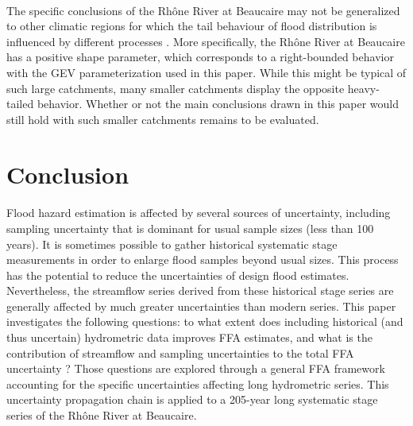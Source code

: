     \paragraph{}
    The specific conclusions of the Rhône River at Beaucaire may not be generalized to other climatic regions for which the tail behaviour of flood distribution is influenced by different processes \citep{merz_understanding_2022}. More specifically, the Rhône River at Beaucaire has a positive shape parameter, which corresponds to a right-bounded behavior with the GEV parameterization used in this paper. While this might be typical of such large catchments, many smaller catchments display the opposite heavy-tailed behavior. Whether or not the main conclusions drawn in this paper would still hold with such smaller catchments remains to be evaluated.

    
\section{Conclusion}
\label{sec:Conclusion}

    \paragraph{} Flood hazard estimation is affected by several sources of uncertainty, including sampling uncertainty that is dominant for usual sample sizes (less than 100 years). It is sometimes possible to gather historical systematic stage measurements in order to enlarge flood samples beyond usual sizes. This process has the potential to reduce the uncertainties of design flood estimates. Nevertheless, the streamflow series derived from these historical stage series are generally affected by much greater uncertainties than modern series. This paper investigates the following questions: to what extent does including historical (and thus uncertain) hydrometric data improves FFA estimates, and what is the contribution of streamflow and sampling uncertainties to the total FFA uncertainty ? Those questions are explored through a general FFA framework accounting for the specific uncertainties affecting long hydrometric series. This uncertainty propagation chain is applied to a 205-year long systematic stage series of the Rhône River at Beaucaire.

